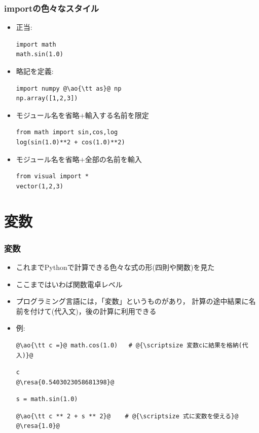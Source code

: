 \documentclass[10pt,dvipdfmx]{beamer}
\newcommand{\ore}[1]{{\color{orange}#1}}
\newcommand{\ao}[1]{{\color{blue}#1}}
\newcommand{\resa}[1]{\ore{\textsl{$\rightarrow$ #1}}}
\begin{document}
\begin{frame}[fragile]
\frametitle{importの色々なスタイル}
\begin{itemize}
\item 正当:
\begin{lstlisting}
import math
math.sin(1.0)
\end{lstlisting}
\item 略記を定義:
\begin{lstlisting}
import numpy @\ao{\tt as}@ np
np.array([1,2,3])
\end{lstlisting}
\item モジュール名を省略$+$輸入する名前を限定
\begin{lstlisting}
from math import sin,cos,log
log(sin(1.0)**2 + cos(1.0)**2)
\end{lstlisting}
\item モジュール名を省略$+$全部の名前を輸入
\begin{lstlisting}
from visual import *
vector(1,2,3)
\end{lstlisting}
\end{itemize}
\end{frame}

\section{変数}

\begin{frame}[fragile]
\frametitle{変数}
\begin{itemize}
\item これまでPythonで計算できる色々な式の形(四則や関数)を見た
\item ここまではいわば関数電卓レベル
\item プログラミング言語には，\ao{「変数」}というものがあり，
  計算の途中結果に名前を付けて(代入文)，後の計算に利用できる
\item 例:
\begin{lstlisting}
@\ao{\tt c =}@ math.cos(1.0)   # @{\scriptsize 変数cに結果を格納(代入)}@
\end{lstlisting}
\begin{lstlisting}
c
@\resa{0.5403023058681398}@
\end{lstlisting}
\begin{lstlisting}
s = math.sin(1.0)
\end{lstlisting}
\begin{lstlisting}
@\ao{\tt c ** 2 + s ** 2}@    # @{\scriptsize 式に変数を使える}@
@\resa{1.0}@
\end{lstlisting}
\end{itemize}
\end{frame}
\end{document}
